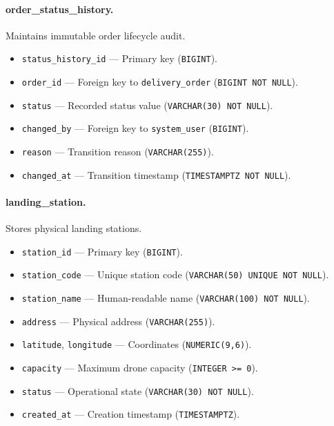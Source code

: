 \paragraph{order\_status\_history.}
Maintains immutable order lifecycle audit.
\begin{itemize}
    \item \texttt{status\_history\_id} — Primary key (\texttt{BIGINT}).
    \item \texttt{order\_id} — Foreign key to \texttt{delivery\_order} (\texttt{BIGINT NOT NULL}).
    \item \texttt{status} — Recorded status value (\texttt{VARCHAR(30) NOT NULL}).
    \item \texttt{changed\_by} — Foreign key to \texttt{system\_user} (\texttt{BIGINT}).
    \item \texttt{reason} — Transition reason (\texttt{VARCHAR(255)}).
    \item \texttt{changed\_at} — Transition timestamp (\texttt{TIMESTAMPTZ NOT NULL}).
\end{itemize}

\paragraph{landing\_station.}
Stores physical landing stations.
\begin{itemize}
    \item \texttt{station\_id} — Primary key (\texttt{BIGINT}).
    \item \texttt{station\_code} — Unique station code (\texttt{VARCHAR(50) UNIQUE NOT NULL}).
    \item \texttt{station\_name} — Human-readable name (\texttt{VARCHAR(100) NOT NULL}).
    \item \texttt{address} — Physical address (\texttt{VARCHAR(255)}).
    \item \texttt{latitude}, \texttt{longitude} — Coordinates (\texttt{NUMERIC(9,6)}).
    \item \texttt{capacity} — Maximum drone capacity (\texttt{INTEGER >= 0}).
    \item \texttt{status} — Operational state (\texttt{VARCHAR(30) NOT NULL}).
    \item \texttt{created\_at} — Creation timestamp (\texttt{TIMESTAMPTZ}).
\end{itemize}

